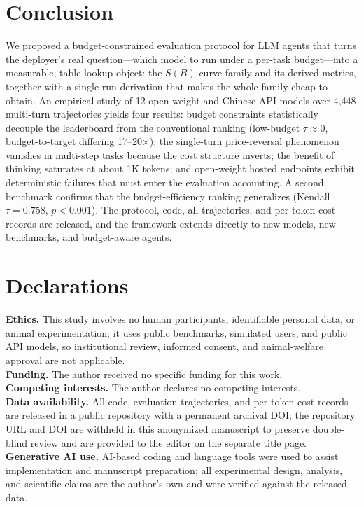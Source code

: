 \documentclass[preprint,authoryear,12pt]{elsarticle}
\begin{document}
\section{Conclusion}
\label{sec:conclusion}
We proposed a budget-constrained evaluation protocol for LLM agents that turns the deployer's real question---which model to run under a per-task budget---into a measurable, table-lookup object: the $S(B)$ curve family and its derived metrics, together with a single-run derivation that makes the whole family cheap to obtain. An empirical study of 12 open-weight and Chinese-API models over 4,448 multi-turn trajectories yields four results: budget constraints statistically decouple the leaderboard from the conventional ranking (low-budget $\tau\approx0$, budget-to-target differing 17--20$\times$); the single-turn price-reversal phenomenon vanishes in multi-step tasks because the cost structure inverts; the benefit of thinking saturates at about 1K tokens; and open-weight hosted endpoints exhibit deterministic failures that must enter the evaluation accounting. A second benchmark confirms that the budget-efficiency ranking generalizes (Kendall $\tau=0.758$, $p<0.001$). The protocol, code, all trajectories, and per-token cost records are released, and the framework extends directly to new models, new benchmarks, and budget-aware agents.


\section*{Declarations}
\noindent\textbf{Ethics.} This study involves no human participants, identifiable personal data, or animal experimentation; it uses public benchmarks, simulated users, and public API models, so institutional review, informed consent, and animal-welfare approval are not applicable.\\
\noindent\textbf{Funding.} The author received no specific funding for this work.\\
\noindent\textbf{Competing interests.} The author declares no competing interests.\\
\noindent\textbf{Data availability.} All code, evaluation trajectories, and per-token cost records are released in a public repository with a permanent archival DOI; the repository URL and DOI are withheld in this anonymized manuscript to preserve double-blind review and are provided to the editor on the separate title page.\\
\noindent\textbf{Generative AI use.} AI-based coding and language tools were used to assist implementation and manuscript preparation; all experimental design, analysis, and scientific claims are the author's own and were verified against the released data.\\
\end{document}
